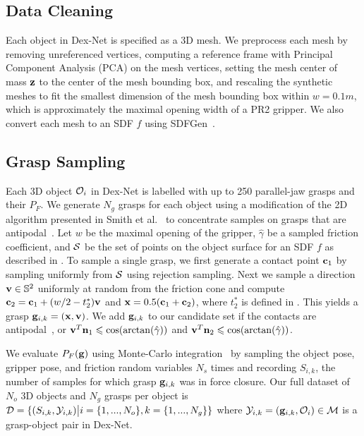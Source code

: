 

\subsection{Data Cleaning}
Each object in Dex-Net is specified as a 3D mesh.
We preprocess each mesh by removing unreferenced vertices, computing a reference frame with Principal Component Analysis (PCA) on the mesh vertices, setting the mesh center of mass $\mathbf{z}$ to the center of the mesh bounding box, and rescaling the synthetic meshes to fit the smallest dimension of the mesh bounding box within $w = 0.1m$, which is approximately the maximal opening width of a PR2 gripper.
We also convert each mesh to an SDF $f$ using SDFGen~\cite{sdfgen}.

\subsection{Grasp Sampling}
Each 3D object $\mathcal{O}_i$ in Dex-Net is labelled with up to 250 parallel-jaw grasps and their $P_F$.
We generate $N_g$ grasps for each object using a modification of the 2D algorithm presented in Smith et al.~\cite{smith1999computing} to concentrate samples on grasps that are antipodal~\cite{mahler2015gp}.
Let $w$ be the maximal opening of the gripper, $\hat{\gamma}$ be a sampled friction coefficient, and $\mathcal{S}$ be the set of points on the object surface for an SDF $f$ as described in .
To sample a single grasp, we first generate a contact point $\mathbf{c}_1$ by sampling uniformly from $\mathcal{S}$ using rejection sampling.
Next we sample a direction $\mathbf{v} \in \mathbb{S}^2$ uniformly at random from the friction cone and compute $\mathbf{c}_2 = \mathbf{c}_1 + (w / 2 - t_2^*) \mathbf{v}$ and $\mathbf{x} = 0.5 (\mathbf{c}_1 + \mathbf{c}_2)$, where $t_2^*$ is defined in .
This yields a grasp $\mathbf{g}_{i,k} = (\mathbf{x}, \mathbf{v})$.
We add $\mathbf{g}_{i,k}$ to our candidate set if the contacts are antipodal~\cite{mahler2015gp}, or $\mathbf{v}^T \mathbf{n}_1 \leqslant \cos(\arctan(\hat{\gamma}))$ and $\mathbf{v}^T \mathbf{n}_2 \leqslant \cos(\arctan(\hat{\gamma}))$.

We evaluate $P_F(\mathbf{g})$ using Monte-Carlo integration~\cite{kehoe2012toward} by sampling the object pose, gripper pose, and friction random variables $N_s$ times and recording $S_{i,k}$, the number of samples for which grasp $\mathbf{g}_{i,k}$ was in force closure.
Our full dataset of $N_o$ 3D objects and $N_g$ grasps per object is $\mathcal{D} = \{ (S_{i, k}, \mathcal{Y}_{i, k}) \big| i = \{1, ..., N_o\}, k = \{1, ..., N_g\} \}$ where $\mathcal{Y}_{i,k} = (\mathbf{g}_{i, k}, \mathcal{O}_i) \in \mathcal{M}$ is a grasp-object pair in Dex-Net.


